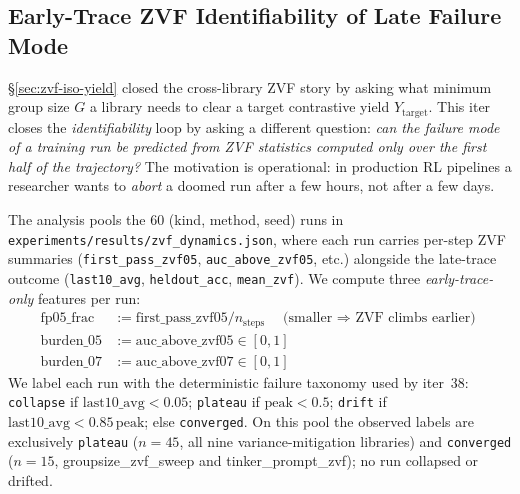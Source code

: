 
\subsection{Early-Trace ZVF Identifiability of Late Failure Mode}
\label{sec:zvf-early-identify}
\S\ref{sec:zvf-iso-yield} closed the cross-library ZVF story by
asking what minimum group size $G$ a library needs to clear a target
contrastive yield $Y_{\mathrm{target}}$. This iter closes the
\emph{identifiability} loop by asking a different question: \emph{can
the failure mode of a training run be predicted from ZVF statistics
computed only over the first half of the trajectory?} The motivation
is operational: in production RL pipelines a researcher wants to
\emph{abort} a doomed run after a few hours, not after a few days.

The analysis pools the 60 (kind, method, seed) runs in
\texttt{experiments/results/zvf_dynamics.json}, where each run carries
per-step ZVF summaries (\texttt{first\_pass\_zvf05}, \texttt{auc\_above\_zvf05},
etc.) alongside the late-trace outcome (\texttt{last10\_avg},
\texttt{heldout\_acc}, \texttt{mean\_zvf}). We compute three
\emph{early-trace-only} features per run:
%
\begin{align*}
\mathrm{fp05\_frac} &:= \mathrm{first\_pass\_zvf05}/n_{\mathrm{steps}}
    \quad\text{(smaller $\Rightarrow$ ZVF climbs earlier)}\\
\mathrm{burden\_05} &:= \mathrm{auc\_above\_zvf05} \in [0,1]\\
\mathrm{burden\_07} &:= \mathrm{auc\_above\_zvf07} \in [0,1]
\end{align*}
%
We label each run with the deterministic failure taxonomy used by
iter~38: \texttt{collapse} if $\mathrm{last10\_avg}<0.05$;
\texttt{plateau} if $\mathrm{peak}<0.5$; \texttt{drift} if
$\mathrm{last10\_avg}<0.85\,\mathrm{peak}$; else \texttt{converged}.
On this pool the observed labels are exclusively \texttt{plateau}
($n{=}45$, all nine variance-mitigation libraries) and
\texttt{converged} ($n{=}15$, groupsize\_zvf\_sweep and
tinker\_prompt\_zvf); no run collapsed or drifted.

